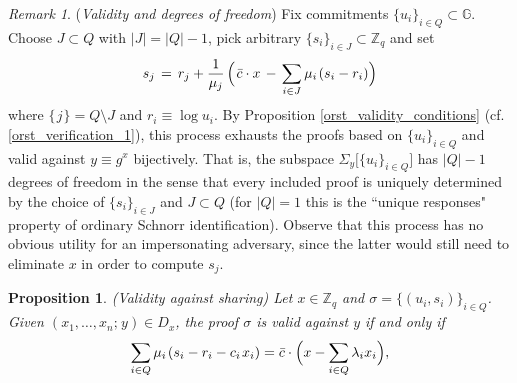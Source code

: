 \documentclass[10pt, psamsfonts, reqno]{amsart}
\newtheorem{prop}[thm]{Proposition}
\theoremstyle{definition}
\theoremstyle{remark}
\newtheorem{rem}[thm]{Remark}
\numberwithin{equation}{section}
\begin{document}
\begin{rem}\label{orst_validity_degrees_of_freedom}
(\textit{Validity and degrees of freedom})
Fix commitments $\{u_i\}_{i \in Q} \subset \mathbb{G}$.
Choose $J \subset Q$ with $|J| = |Q| - 1$,
pick arbitrary $\{s_i\}_{i \in J} \subset \mathbb{Z}_q$
and set
\vspace{5pt}
\begin{equation*}\label{orst_validity_degrees_of_freedom_formula}
s_j
	\hspace{1.5pt}
	=
	\hspace{1.5pt}
	r_j + \frac{1}{\mu_j}
	\hspace{1.5pt}
	\Big(
		\hspace{1.0pt}
		\bar{c}\cdot x
		\hspace{1.5pt}
		-
		\hspace{1.5pt}
		\sum_{i \in J}
			\mu_i
			\hspace{1pt}
			(s_i - r_i)
	\Big)
\vspace{5pt}
\end{equation*}
where $\{\hspace{1pt}j\hspace{1pt}\} = Q \setminus J$
and $r_i \equiv \log u_i$.
By Proposition \ref{orst_validity_conditions}
(cf. \eqref{orst_verification_1}),
this process exhausts the proofs
based on $\{u_i\}_{i \in Q}$ and valid against
$y \equiv g ^ x$
bijectively.
That is, the subspace
$\Sigma_y \big[\{u_i\}_{i \in Q}\big]$
has $|Q| - 1$ degrees of freedom in the sense that
every included proof is uniquely determined
by the choice of $\{s_i\}_{i \in J}$
and $J \subset Q$ (for $|Q| = 1$
this is the ``unique responses" property
of ordinary Schnorr identification).
Observe that this process has no obvious utility
for an impersonating adversary,
since the latter would still need
to eliminate $x$ in order to compute $s_j$.
\end{rem}

\begin{prop}\label{orst_validity_against_sharing_prop}
\textup{(\textit{Validity against sharing})}
Let $x \in \mathbb{Z}_q$ and
$\sigma = \{(u_i, s_i)\}_{i \in Q}$.
Given $(x_1, \dots, x_n;\hspace{1pt} y) \in D_x$,
the proof $\sigma$ is valid against $y$ if and only if
\vspace{5pt}
\begin{equation}\label{orst_validity_against_sharing}
\sum_{i \in Q} \mu_i\hspace{1pt} (s_i - r_i - c_i\hspace{1pt}x_i)
=
\bar{c} \cdot \Big(x - \sum_{i \in Q} \lambda_i x_i\Big),
\vspace{5pt}
\end{equation}
\end{prop}
\end{document}
